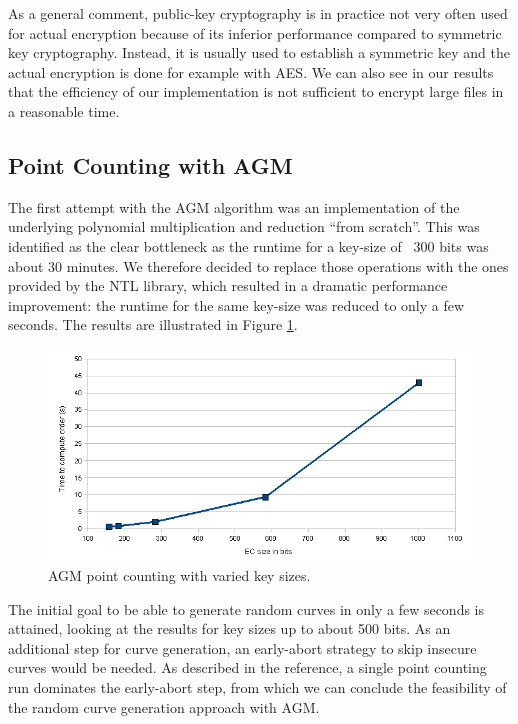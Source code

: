 \documentclass[11pt,english]{article}
\begin{document}
As a general comment, public-key cryptography is in practice not very often used for actual encryption because of its inferior performance compared to symmetric key cryptography. Instead, it is usually used to establish a symmetric key and the actual encryption is done for example with AES. We can also see in our results that the efficiency of our implementation is not sufficient to encrypt large files in a reasonable time.

\subsection{Point Counting with AGM}
The first attempt with the AGM algorithm was an implementation of the underlying polynomial multiplication and reduction ``from scratch''. This was identified as the clear bottleneck as the runtime for a key-size of ~300 bits was about 30 minutes. We therefore decided to replace those operations with the ones provided by the NTL library, which resulted in a dramatic performance improvement: the runtime for the same key-size was reduced to only a few seconds. The results are illustrated in Figure \ref{figure:agm}.

\label{agmres}
\begin{figure}[h]
\centering
\includegraphics[scale=0.6]{dia1.png}
\caption{AGM point counting with varied key sizes.}
\label{figure:agm}
\end{figure}

The initial goal to be able to generate random curves in only a few seconds is attained, looking at the results for key sizes up to about 500 bits. As an additional step for curve generation, an early-abort strategy to skip insecure curves \cite{satohfgh} would be needed. As described in the reference, a single point counting run dominates the early-abort step, from which we can conclude the feasibility of the random curve generation approach with AGM.
\end{document}
